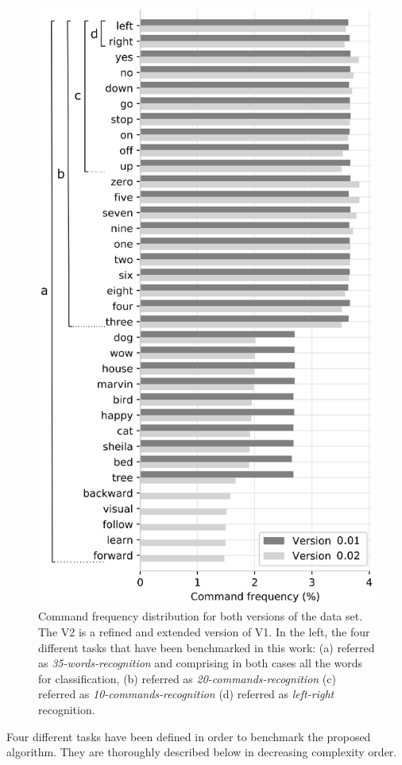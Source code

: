 \documentclass{elsarticle}
\begin{document}
\begin{figure}[ht]
	\centering
	\includegraphics[width=0.45\linewidth]{img/freqdist_data}
	\caption{Command frequency distribution for both versions of the data set. The V2 is a refined and extended version of V1. In the left, the four different tasks that have been benchmarked in this work: (a) referred as \textit{35-words-recognition} and comprising in both cases all the words for classification, (b) referred as \textit{20-commands-recognition}  (c) referred as \textit{10-commands-recognition} (d) referred as \textit{left-right} recognition.}
	\label{fig:freqdistdata}
\end{figure}

Four different tasks have been defined in order to benchmark the proposed algorithm. They are thoroughly described below in decreasing complexity order.
\end{document}
